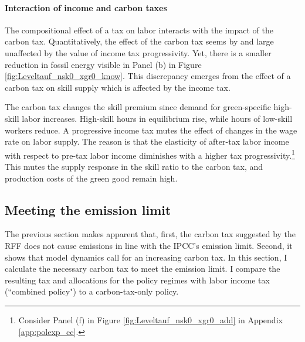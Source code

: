  
  
\paragraph{Interaction of income and carbon taxes}
The compositional effect of a tax on labor interacts with the impact of the carbon tax.
  Quantitatively, the effect of the carbon tax seems by and large unaffected by the value of income tax progressivity.
 Yet, there is a smaller reduction in fossil energy visible in Panel (b) in Figure \ref{fig:Leveltauf_nsk0_xgr0_know}.
This discrepancy emerges from the effect of a carbon tax on skill supply which is affected by the income tax. 

    The carbon tax changes the skill premium since demand for green-specific high-skill labor increases. High-skill hours in equilibrium rise, while hours of low-skill workers reduce.  A progressive income tax mutes the effect of changes in the wage rate on labor supply. The reason is that the elasticity of after-tax labor income with respect to pre-tax labor income diminishes with a higher tax progressivity.\footnote{Consider Panel (f) in Figure \ref{fig:Leveltauf_nsk0_xgr0_add} in Appendix \ref{app:polexp_cc}.} This mutes the supply response in the skill ratio to the carbon tax, and production costs of the green good remain high.
   
  
\subsection{Meeting the emission limit}\label{subsec:meetlim}
 
The previous section makes apparent that, first, the carbon tax suggested by the RFF does not cause emissions in line with the IPCC's emission limit.  Second, it shows that model dynamics call for an increasing carbon tax. In this section, I calculate the necessary carbon tax to meet the emission limit. I compare the resulting tax and allocations for the policy regimes with labor income tax (``combined policy") to a carbon-tax-only policy.
 

